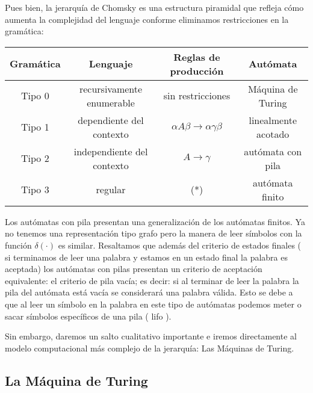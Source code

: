 \vspace{10px}

Pues bien, la jerarquía de Chomsky es una estructura piramidal que refleja cómo aumenta la complejidad del lenguaje conforme eliminamos restricciones en la gramática:

\vspace{1cm}


\begin{center}
	\begin{tabular}{|c|c|c|c|}
		\hline 
		Gramática & Lenguaje  &Reglas de producción   & Autómata  \\ 
		\hline 
		Tipo 0	& recursivamente enumerable  & sin restricciones  & Máquina de Turing  \\ 
		\hline 
		Tipo 1	& dependiente del contexto  & $\alpha A \beta \rightarrow \alpha \gamma \beta$ & linealmente acotado  \\ 
		\hline 
		Tipo 2	& independiente del contexto  & $A \rightarrow \gamma $  & autómata con pila   \\ 
		\hline 
		Tipo 3	& regular  & (*) & autómata finito \\
		\hline 
	\end{tabular} 
\end{center}

\vspace{1cm}

Los autómatas con pila presentan una generalización de los autómatas finitos. Ya no tenemos una representación tipo grafo pero la manera de leer símbolos con la función $\delta(\cdot)$ es similar. Resaltamos que además del criterio de estados finales ( si terminamos de leer una palabra y estamos en un estado final la palabra es aceptada) los autómatas con pilas presentan un criterio de aceptación equivalente: el criterio de pila vacía; es decir: si al terminar de leer la palabra la pila del autómata está vacía se considerará una palabra válida. Esto se debe a que al leer un símbolo en la palabra en este tipo de autómatas podemos meter o sacar símbolos específicos de una pila ( lifo ).

\vspace{10px}

Sin embargo, daremos un salto cualitativo importante e iremos directamente al modelo computacional más complejo de la jerarquía: Las Máquinas de Turing.



\subsection{La Máquina de Turing}

